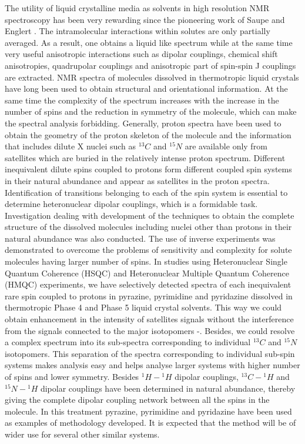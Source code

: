 The utility of liquid crystalline media as solvents in high resolution NMR
spectroscopy has been very rewarding since the pioneering work of Saupe and
Englert \cite{chap22-key12}. The intramolecular interactions within solutes are only partially
averaged. As a result, one obtains a liquid like spectrum while at the same time
very useful anisotropic interactions such as dipolar couplings, chemical shift
anisotropies, quadrupolar couplings and anisotropic part of spin-spin J couplings
are extracted. NMR spectra of molecules dissolved in thermotropic liquid crystals
have long been used to obtain structural and orientational information. At the
same time the complexity of the spectrum increases with the increase in the
number of spins and the reduction in symmetry of the molecule, which can make
the spectral analysis forbidding. Generally, proton spectra have been used to
obtain the geometry of the proton skeleton of the molecule and the information
that includes dilute X nuclei such as ${}^{13}C$ and ${}^{15} N$ are available only from satellites
which are buried in the relatively intense proton spectrum. Different inequivalent
dilute spins coupled to protons form different coupled spin systems in their
natural abundance and appear as satellites in the proton spectra. Identification of
transitions belonging to each of the spin system is essential to determine
heteronuclear dipolar couplings, which is a formidable task. Investigation dealing
with development of the techniques to obtain the complete structure of the
dissolved molecules including nuclei other than protons in their natural
abundance was also conducted. The use of inverse experiments was demonstrated
to overcome the problems of sensitivity and complexity for solute molecules
having larger number of spins. In studies using Heteronuclear Single Quantum
Coherence (HSQC) and Heteronuclear Multiple Quantum Coherence (HMQC)
experiments, we have selectively detected spectra of each inequivalent rare spin
coupled to protons in pyrazine, pyrimidine and pyridazine dissolved in
thermotropic Phase 4 and Phase 5 liquid crystal solvents. This way we could
obtain enhancement in the intensity of satellites signals without the interference
from the signals connected to the major isotopomers \cite{chap22-key13}-\cite{chap22-key14}. Besides, we could
resolve a complex spectrum into its sub-spectra corresponding to individual ${}^{13}C$
and ${}^{15} N$ isotopomers. This separation of the spectra corresponding to individual
sub-spin systems makes analysis easy and helps analyse larger systems with
higher number of spins and lower symmetry. Besides ${}^1 H-{}^1 H$ dipolar couplings,
${}^{13} C- {}^1 H$ and ${}^{15} N- {}^1 H$ dipolar couplings have been determined in natural abundance,
thereby giving the complete dipolar coupling network between all the spins in the
molecule. In this treatment pyrazine, pyrimidine and pyridazine have been used
as examples of methodology developed. It is expected that the method will be of
wider use for several other similar systems.

